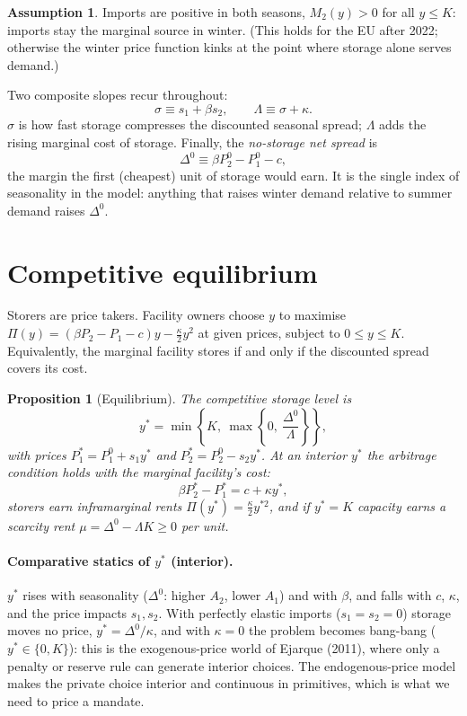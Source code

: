 \documentclass[11pt]{article}
\newtheorem{proposition}{Proposition}
\theoremstyle{definition}
\newtheorem{assumption}{Assumption}
\newcommand{\Dz}{\Delta^{0}}
\begin{document}
\begin{assumption}\label{ass:interior}
Imports are positive in both seasons, $M_2(y)>0$ for all $y\le K$: imports stay the marginal source
in winter. (This holds for the EU after 2022; otherwise the winter price function kinks at the point
where storage alone serves demand.)
\end{assumption}

Two composite slopes recur throughout:
\begin{equation}
\sigma \equiv s_1 + \beta s_2, \qquad \Lambda \equiv \sigma+\kappa .
\end{equation}
$\sigma$ is how fast storage compresses the discounted seasonal spread; $\Lambda$ adds the rising
marginal cost of storage. Finally, the \emph{no-storage net spread} is
\begin{equation}
\Dz \equiv \beta P^0_2 - P^0_1 - c,
\end{equation}
the margin the first (cheapest) unit of storage would earn. It is the single index of seasonality in
the model: anything that raises winter demand relative to summer demand raises $\Dz$.

\section{Competitive equilibrium}

Storers are price takers. Facility owners choose $y$ to maximise
$\Pi(y)=\left(\beta P_2-P_1-c\right)y-\frac{\kappa}{2}y^{2}$ at given prices, subject to $0\le y\le K$.
Equivalently, the marginal facility stores if and only if the discounted spread covers its cost.

\begin{proposition}[Equilibrium]\label{prop:eq}
The competitive storage level is
\begin{equation}
y^{*}=\min\left\{K,\ \max\left\{0,\ \frac{\Dz}{\Lambda}\right\}\right\},
\end{equation}
with prices $P_1^*=P_1^0+s_1y^*$ and $P_2^*=P_2^0-s_2y^*$. At an interior $y^*$ the arbitrage
condition holds with the marginal facility's cost:
\begin{equation}
\beta P_2^* - P_1^* = c + \kappa y^*,
\end{equation}
storers earn inframarginal rents $\Pi(y^*)=\frac{\kappa}{2}y^{*2}$, and if $y^*=K$ capacity earns a
scarcity rent $\mu=\Dz-\Lambda K\ge 0$ per unit.
\end{proposition}

\paragraph{Comparative statics of $y^*$ (interior).}
$y^*$ rises with seasonality ($\Dz$: higher $A_2$, lower $A_1$) and with $\beta$, and falls with $c$,
$\kappa$, and the price impacts $s_1,s_2$. With perfectly elastic imports ($s_1=s_2=0$) storage moves no
price, $y^*=\Dz/\kappa$, and with $\kappa=0$ the problem becomes bang-bang ($y^*\in\{0,K\}$): this is the
exogenous-price world of Ejarque (2011), where only a penalty or reserve rule can generate interior
choices. The endogenous-price model makes the private choice interior and continuous in primitives,
which is what we need to price a mandate.
\end{document}
